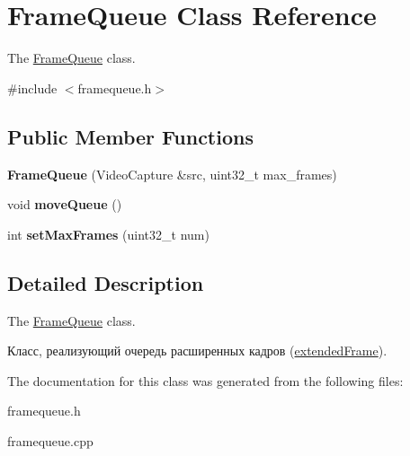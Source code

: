 \hypertarget{class_frame_queue}{}\section{Frame\+Queue Class Reference}
\label{class_frame_queue}


The \hyperlink{class_frame_queue}{Frame\+Queue} class.  




{\ttfamily \#include $<$framequeue.\+h$>$}

\subsection*{Public Member Functions}
\begin{DoxyCompactItemize}
\item 
\mbox{\label{class_frame_queue_ac21733d5447ae4d0e1d946d500434f4b}} 
{\bfseries Frame\+Queue} (Video\+Capture \&src, uint32\+\_\+t max\+\_\+frames)
\item 
\mbox{\label{class_frame_queue_aab2fde0b8bee872c5db389d568928054}} 
void {\bfseries move\+Queue} ()
\item 
\mbox{\label{class_frame_queue_a5eee81a87da92160507101252079f43b}} 
int {\bfseries set\+Max\+Frames} (uint32\+\_\+t num)
\end{DoxyCompactItemize}


\subsection{Detailed Description}
The \hyperlink{class_frame_queue}{Frame\+Queue} class. 

Класс, реализующий очередь расширенных кадров (\hyperlink{classextended_frame}{extended\+Frame}). 

The documentation for this class was generated from the following files\+:\begin{DoxyCompactItemize}
\item 
framequeue.\+h\item 
framequeue.\+cpp\end{DoxyCompactItemize}
